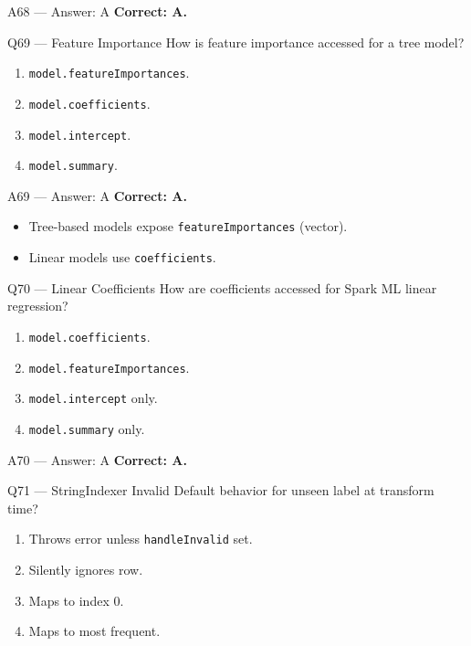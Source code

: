 \documentclass[aspectratio=169,10pt]{beamer}
\begin{document}
	\begin{frame}{A68 — Answer: A}
		\textbf{Correct: A.}
	\end{frame}
	
	\begin{frame}{Q69 — Feature Importance}
		How is feature importance accessed for a tree model?
		\begin{enumerate}[label=\Alph*.]
			\item \texttt{model.featureImportances}.
			\item \texttt{model.coefficients}.
			\item \texttt{model.intercept}.
			\item \texttt{model.summary}.
		\end{enumerate}
	\end{frame}
	
	\begin{frame}{A69 — Answer: A}
		\textbf{Correct: A.}
		\begin{itemize}
			\item Tree-based models expose \texttt{featureImportances} (vector).
			\item Linear models use \texttt{coefficients}.
		\end{itemize}
	\end{frame}
	
	\begin{frame}{Q70 — Linear Coefficients}
		How are coefficients accessed for Spark ML linear regression?
		\begin{enumerate}[label=\Alph*.]
			\item \texttt{model.coefficients}.
			\item \texttt{model.featureImportances}.
			\item \texttt{model.intercept} only.
			\item \texttt{model.summary} only.
		\end{enumerate}
	\end{frame}
	
	\begin{frame}{A70 — Answer: A}
		\textbf{Correct: A.}
	\end{frame}
	
	\begin{frame}{Q71 — StringIndexer Invalid}
		Default behavior for unseen label at transform time?
		\begin{enumerate}[label=\Alph*.]
			\item Throws error unless \texttt{handleInvalid} set.
			\item Silently ignores row.
			\item Maps to index 0.
			\item Maps to most frequent.
		\end{enumerate}
	\end{frame}
	
\end{document}
